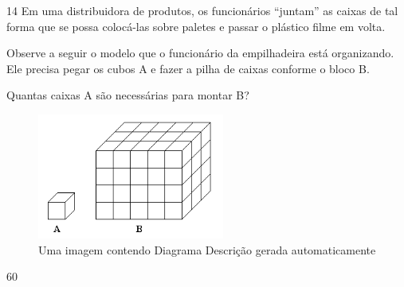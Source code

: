 \begin{escolha}
\begin{boxmedio}
\begin{boxmedio}
{\begin{boxpeq}
\begin{boxpeq}
{\begin{boxpeq}
\begin{boxmedio}
\begin{boxmedio}
\begin{boxpeq}
\begin{boxmedio}
\begin{boxpeq}
\begin{boxpeq}
\begin{boxpeq}
\begin{boxpeq}
\begin{boxmedio}
{\begin{boxmedio}
\begin{boxmedio}
\begin{boxpeq}
\begin{boxmedio}
\begin{boxpeq}
\begin{boxpeq}
\begin{boxpeq}
\begin{escolha}
{\begin{boxmedio}
\begin{boxpeq}
\begin{boxpeq}
\begin{boxpeq}
\begin{boxpeq}
\begin{boxpeq}
\begin{boxmedio}
\begin{boxpeq}
\begin{boxpeq}
\begin{boxpeq}
{\begin{boxpeq}
\begin{boxmedio}
\begin{boxpeq}
\begin{boxpeq}
\begin{boxpeq}
{\begin{boxpeq}
\begin{boxmedio}
{\begin{boxpeq}
\begin{boxpeq}
\begin{boxmedio}
\begin{boxmedio}
\begin{boxpeq}
\begin{boxpeq}
{\begin{boxpeq}
\begin{boxpeq}
\begin{boxpeq}
\begin{boxpeq}
\begin{boxpeq}
\begin{escolha}
\begin{escolha}
{\begin{boxmedio}
\begin{boxpeq}
\begin{q°}
\begin{boxmedio}
\begin{boxpeq}
\begin{boxpeq}
\begin{boxmedio}
\begin{boxmedio}
\begin{boxmedio}
\begin{boxmedio}
{\begin{escolha}
\begin{escolha}
\num{14} Em uma distribuidora de produtos, os funcionários ``juntam'' as
caixas de tal forma que se possa colocá-las sobre paletes e passar o
plástico filme em volta.

Observe a seguir o modelo que o funcionário da empilhadeira está
organizando. Ele precisa pegar os cubos A e fazer a pilha de caixas
conforme o bloco B.

Quantas caixas A são necessárias para montar B?

\begin{figure}
\centering
\includegraphics[width=2.41146in,height=1.62619in]{./_SAEB_9_MAT/media/image259.png}
\caption{Uma imagem contendo Diagrama Descrição gerada automaticamente}
\end{figure}

\begin{escolha}

  \item 60


\end{escolha}
\end{escolha}
\end{escolha}}
\end{boxmedio}
\end{boxmedio}
\end{boxmedio}
\end{boxmedio}
\end{boxpeq}
\end{boxpeq}
\end{boxmedio}
\end{q°}
\end{boxpeq}
\end{boxmedio}}
\end{escolha}
\end{escolha}
\end{boxpeq}
\end{boxpeq}
\end{boxpeq}
\end{boxpeq}
\end{boxpeq}}
\end{boxpeq}
\end{boxpeq}
\end{boxmedio}
\end{boxmedio}
\end{boxpeq}
\end{boxpeq}}
\end{boxmedio}
\end{boxpeq}}
\end{boxpeq}
\end{boxpeq}
\end{boxpeq}
\end{boxmedio}
\end{boxpeq}}
\end{boxpeq}
\end{boxpeq}
\end{boxpeq}
\end{boxmedio}
\end{boxpeq}
\end{boxpeq}
\end{boxpeq}
\end{boxpeq}
\end{boxpeq}
\end{boxmedio}}
\end{escolha}
\end{boxpeq}
\end{boxpeq}
\end{boxpeq}
\end{boxmedio}
\end{boxpeq}
\end{boxmedio}
\end{boxmedio}}
\end{boxmedio}
\end{boxpeq}
\end{boxpeq}
\end{boxpeq}
\end{boxpeq}
\end{boxmedio}
\end{boxpeq}
\end{boxmedio}
\end{boxmedio}
\end{boxpeq}}
\end{boxpeq}
\end{boxpeq}}
\end{boxmedio}
\end{boxmedio}
\end{escolha}
